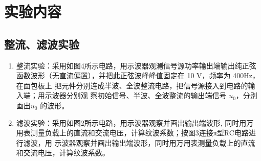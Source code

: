 \documentclass[UTF8]{ctexart}
\begin{document}
\section{实验内容}
\subsection{整流、滤波实验}
\begin{enumerate}
    \item 整流实验：采用如图4所示电路，用示波器观测信号源功率输出端输出纯正弦函数波形（无直流偏置），并把此正弦波峰峰值固定在 10 V，频率为 400Hz，在面包板上
    把元件分别连成半波、全波整流电路，把信号源接入到电路的输入端；用示波器分别观 察初始信号、半波、全波整流的输出端信号
    $u_0$，分别画出$u_0$ 的波形。
    \item 滤波实验：采用如图2所示电路，用示波器观察并画出输出端波形, 同时用万
    用表测量负载上的直流和交流电压，计算纹波系数；按图3连接π型RC电路进行滤波，用
    示波器观察并画出输出端波形，同时用万用表测量负载上的直流和交流电压，计算纹波系数。
\end{enumerate}
\end{document}
